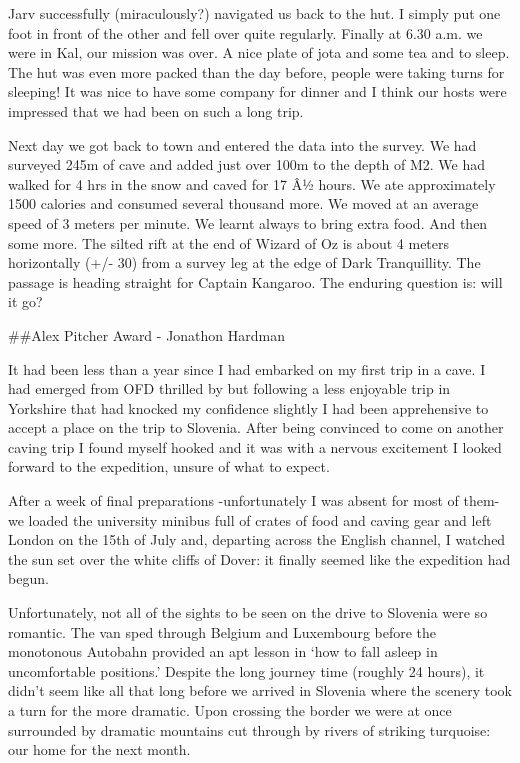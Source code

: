 Jarv successfully (miraculously?) navigated us back to the hut. I simply
put one foot in front of the other and fell over quite regularly.
Finally at 6.30 a.m. we were in Kal, our mission was over. A nice plate
of jota and some tea and to sleep. The hut was even more packed than the
day before, people were taking turns for sleeping! It was nice to have
some company for dinner and I think our hosts were impressed that we had
been on such a long trip.

Next day we got back to town and entered the data into the survey. We
had surveyed 245m of cave and added just over 100m to the depth of M2.
We had walked for 4 hrs in the snow and caved for 17 Â½ hours. We ate
approximately 1500 calories and consumed several thousand more. We moved
at an average speed of 3 meters per minute. We learnt always to bring
extra food. And then some more. The silted rift at the end of Wizard of
Oz is about 4 meters horizontally (+/- 30) from a survey leg at the edge
of Dark Tranquillity. The passage is heading straight for Captain
Kangaroo. The enduring question is: will it go?


\#\#Alex Pitcher Award - Jonathon Hardman

It had been less than a year since I had embarked on my first trip in a
cave. I had emerged from OFD thrilled by but following a less enjoyable
trip in Yorkshire that had knocked my confidence slightly I had been
apprehensive to accept a place on the trip to Slovenia. After being
convinced to come on another caving trip I found myself hooked and it
was with a nervous excitement I looked forward to the expedition, unsure
of what to expect.

After a week of final preparations -unfortunately I was absent for most
of them- we loaded the university minibus full of crates of food and
caving gear and left London on the 15th of July and, departing across
the English channel, I watched the sun set over the white cliffs of
Dover: it finally seemed like the expedition had begun.

Unfortunately, not all of the sights to be seen on the drive to Slovenia
were so romantic. The van sped through Belgium and Luxembourg before the
monotonous Autobahn provided an apt lesson in `how to fall asleep in
uncomfortable positions.' Despite the long journey time (roughly 24
hours), it didn't seem like all that long before we arrived in Slovenia
where the scenery took a turn for the more dramatic. Upon crossing the
border we were at once surrounded by dramatic mountains cut through by
rivers of striking turquoise: our home for the next month.

